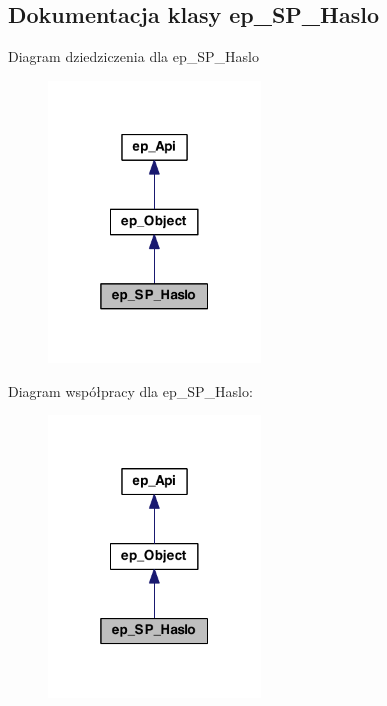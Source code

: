 \hypertarget{classep___s_p___haslo}{\subsection{Dokumentacja klasy ep\-\_\-\-S\-P\-\_\-\-Haslo}
\label{classep___s_p___haslo}
}


Diagram dziedziczenia dla ep\-\_\-\-S\-P\-\_\-\-Haslo\nopagebreak
\begin{figure}[H]
\begin{center}
\leavevmode
\includegraphics[width=160pt]{classep___s_p___haslo__inherit__graph}
\end{center}
\end{figure}


Diagram współpracy dla ep\-\_\-\-S\-P\-\_\-\-Haslo\-:\nopagebreak
\begin{figure}[H]
\begin{center}
\leavevmode
\includegraphics[width=160pt]{classep___s_p___haslo__coll__graph}
\end{center}
\end{figure}

